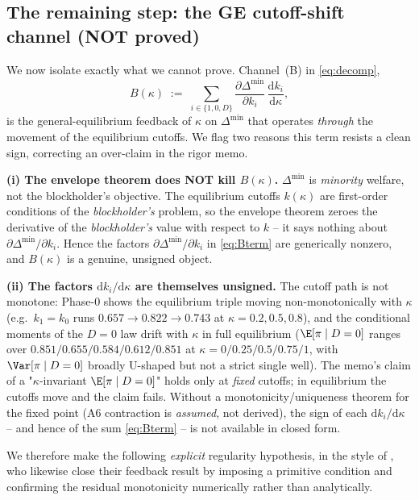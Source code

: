 \subsection*{The remaining step: the GE cutoff-shift channel (NOT proved)}

We now isolate exactly what we cannot prove. Channel~(B) in \eqref{eq:decomp},
\begin{equation}
  B(\kappa)\;:=\;\sum_{i\in\{1,0,D\}}
  \frac{\partial \Delta^{\min}}{\partial k_i}\,\frac{\mathrm{d} k_i}{\mathrm{d}\kappa},
  \label{eq:Bterm}
\end{equation}
is the general-equilibrium feedback of $\kappa$ on $\Delta^{\min}$ that operates
\emph{through} the movement of the equilibrium cutoffs. We flag two reasons this
term resists a clean sign, correcting an over-claim in the rigor memo.

\medskip
\noindent\textbf{(i) The envelope theorem does NOT kill $B(\kappa)$.}
$\Delta^{\min}$ is \emph{minority} welfare, not the blockholder's objective. The
equilibrium cutoffs $k(\kappa)$ are first-order conditions of the
\emph{blockholder's} problem, so the envelope theorem zeroes the derivative of
the \emph{blockholder's} value with respect to $k$ -- it says nothing about
$\partial\Delta^{\min}/\partial k_i$. Hence the factors
$\partial\Delta^{\min}/\partial k_i$ in \eqref{eq:Bterm} are generically
nonzero, and $B(\kappa)$ is a genuine, unsigned object.

\medskip
\noindent\textbf{(ii) The factors $\mathrm{d} k_i/\mathrm{d}\kappa$ are themselves
unsigned.} The cutoff path is not monotone: Phase-0 shows the equilibrium triple
moving non-monotonically with $\kappa$ (e.g.\ $k_1=k_0$ runs
$0.657\!\to\!0.822\!\to\!0.743$ at $\kappa=0.2,0.5,0.8$), and the conditional
moments of the $D=0$ law drift with $\kappa$ in full equilibrium
($\E[\pi\mid D=0]$ ranges over $0.851/0.655/0.584/0.612/0.851$ at
$\kappa=0/0.25/0.5/0.75/1$, with $\Var[\pi\mid D=0]$ broadly U-shaped but not a
strict single well). The memo's claim of a "$\kappa$-invariant
$\E[\pi\mid D=0]$" holds only at \emph{fixed} cutoffs; in equilibrium the
cutoffs move and the claim fails. Without a monotonicity/uniqueness theorem for
the fixed point (A6 contraction is \emph{assumed}, not derived), the sign of
each $\mathrm{d} k_i/\mathrm{d}\kappa$ -- and hence of the sum \eqref{eq:Bterm} -- is
not available in closed form.

\medskip
We therefore make the following \emph{explicit} regularity hypothesis, in the
style of \citet[Condition 1 and the accompanying numerical
verification]{EdmansGoldsteinJiang2015}, who likewise close their feedback
result by imposing a primitive condition and confirming the residual
monotonicity numerically rather than analytically.

